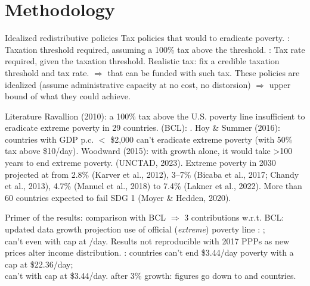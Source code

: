 \documentclass[aspectratio=169,xcolor=dvipsnames, 11pt,mathserif]{beamer}
\begin{document}
\section{Methodology}

\begin{frame}{Idealized redistributive policies} %
    \bbsp
    \ip Tax policies that would  to eradicate poverty.
    \ip \textbf{}: Taxation threshold required, assuming a 100\% tax above the threshold.
    \ip \textbf{}: Tax rate required, given the taxation threshold.
    \ip Realistic tax: fix a credible taxation threshold and tax rate.
    \ip $\Rightarrow$ \textbf{} that can be funded with such tax.
    \ip \warning These policies are idealized (assume administrative capacity at no cost, no distorsion) $\Rightarrow$ upper bound of what they could achieve.
    \ee
\end{frame}

\begin{frame}{Literature}
    \bbvsp
    \ip Ravallion (2010): a 100\% tax above the U.S. poverty line insufficient to eradicate extreme poverty in 29 countries.
    \ip {} (BCL): .
    \ip Hoy \& Summer (2016): countries with GDP p.c. $<$ \$2,000 can't eradicate extreme poverty (with 50\% tax above \$10/day).
    \ip Woodward (2015): with growth alone, it would take >100 years to end extreme poverty. 
    \ip {} (UNCTAD, 2023).
    \ip Extreme poverty in 2030 projected at from 2.8\% (Karver et al., 2012), 3--7\% (Bicaba et al., 2017; Chandy et al., 2013), 4.7\% (Manuel et al., 2018) to 7.4\% (Lakner et al., 2022).
    \ip More than 60 countries expected to fail SDG 1 (Moyer \& Hedden, 2020).
    \ee
\end{frame}

\begin{frame}{Primer of the results: comparison with BCL}
    \bbsp
    \ip $\Rightarrow$ 3 contributions w.r.t. BCL: 
    \bbsp \ip updated data
    \ip growth projection
    \ip use of official (\textit{extreme}) poverty line
    \ee
    \ip {}: ; \\  can't even with cap at /day.
    \ip Results not reproducible with 2017 PPPs as new prices alter income distribution.
    \ip {}:  countries can't end \$3.44/day poverty with a cap at \$22.36/day; \\  can't with cap at \$3.44/day.
    \ip {} after 3\% growth: figures go down to  and  countries.
    \ee
\end{frame}
\end{document}
